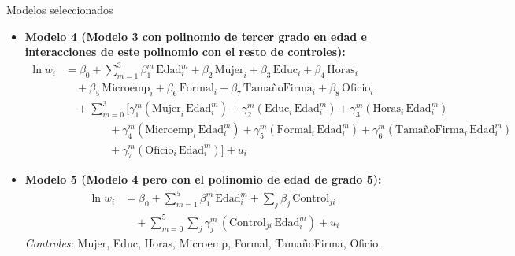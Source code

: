\documentclass[11pt]{beamer}
\begin{document}
\begin{frame}{Modelos seleccionados}

\begin{itemize}
\item \textbf{Modelo 4 (Modelo 3 con polinomio de tercer grado en edad e interacciones de este polinomio con el resto de controles):}
{\tiny
\[
\begin{aligned}
\ln w_{i} &= \beta_{0} 
+ \sum_{m=1}^{3} \beta_{1}^{m}\,\text{Edad}_{i}^{m}
+ \beta_{2}\,\text{Mujer}_{i}
+ \beta_{3}\,\text{Educ}_{i}
+ \beta_{4}\,\text{Horas}_{i}
\\&\quad
+ \beta_{5}\,\text{Microemp}_{i}
+ \beta_{6}\,\text{Formal}_{i}
+ \beta_{7}\,\text{TamañoFirma}_{i}
+ \beta_{8}\,\text{Oficio}_{i}
\\&\quad
+ \sum_{m=0}^{3}\Big[
\gamma_{1}^{m}(\text{Mujer}_{i}\,\text{Edad}_{i}^{m})
+ \gamma_{2}^{m}(\text{Educ}_{i}\,\text{Edad}_{i}^{m})
+ \gamma_{3}^{m}(\text{Horas}_{i}\,\text{Edad}_{i}^{m})
\\&\qquad\qquad
+ \gamma_{4}^{m}(\text{Microemp}_{i}\,\text{Edad}_{i}^{m})
+ \gamma_{5}^{m}(\text{Formal}_{i}\,\text{Edad}_{i}^{m})
+ \gamma_{6}^{m}(\text{TamañoFirma}_{i}\,\text{Edad}_{i}^{m})
\\&\qquad\qquad
+ \gamma_{7}^{m}(\text{Oficio}_{i}\,\text{Edad}_{i}^{m})
\Big]
+ u_{i}
\end{aligned}
\]
}

\item \textbf{Modelo 5 (Modelo 4 pero con el polinomio de edad de grado 5):}
{\small
\[
\begin{aligned}
\ln w_{i} &= \beta_{0} 
+ \sum_{m=1}^{5} \beta_{1}^{m}\,\text{Edad}_{i}^{m}
+ \sum_{j} \beta_{j}\,\text{Control}_{ji}
\\&\quad
+ \sum_{m=0}^{5}\sum_{j} \gamma_{j}^{m}\,(\text{Control}_{ji}\,\text{Edad}_{i}^{m})
+ u_{i}
\end{aligned}
\]
}
\emph{Controles:} Mujer, Educ, Horas, Microemp, Formal, TamañoFirma, Oficio.

\end{itemize}
    
\end{frame}
\end{document}
